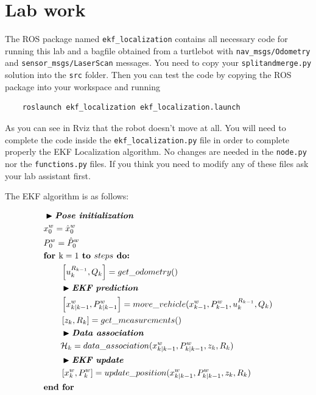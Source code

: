\documentclass[a4paper,10pt]{article}
\begin{document}
\section{Lab work}

The ROS package named \texttt{ekf\_localization} contains all necessary code for running this lab and a bagfile obtained from a turtlebot with \texttt{nav\_msgs/Odometry} and \texttt{sensor\_msgs/LaserScan} messages. You need to copy your \texttt{splitandmerge.py} solution into the \texttt{src} folder. Then you can test the code by copying the ROS package into your workspace and running

\begin{verbatim}
    roslaunch ekf_localization ekf_localization.launch
\end{verbatim}

As you can see in Rviz that the robot doesn't move at all. You will need to complete the code inside the \texttt{ekf\_localization.py} file in order to complete properly the EKF Localization algorithm. No changes are needed in the \texttt{node.py} nor the \texttt{functions.py} files. If you think you need to modify any of these files ask your lab assistant first.


The EKF algorithm is as follows:

\begin{align*} \scriptsize
    & \blacktriangleright \textit{\textbf{Pose initialization}}\\
    & x_0^w = \hat{x}_0^w \\
    & P_0^w = \hat{P}_0^w \\
    & \textbf{for } \text{k} = 1 \textbf{ to } steps \textbf{ do:} \\
    & \qquad \left[ u_k^{R_{k-1}}, Q_k \right] = get\_odometry() \\
    & \qquad \blacktriangleright \textit{\textbf{EKF prediction}}\\
    & \qquad \left[ x_{k|k-1}^w, P_{k|k-1}^w \right] = move\_vehicle(x_{k-1}^w, P_{k-1}^w, u_k^{R_{k-1}}, Q_k) \\
    & \qquad \left[ z_k, R_k \right] = get\_measurements() \\
    & \qquad \blacktriangleright \textit{\textbf{Data association}}\\
    & \qquad \mathcal{H}_k = data\_association(x_{k|k-1}^w, P_{k|k-1}^w, z_k, R_k) \\
    & \qquad \blacktriangleright \textit{\textbf{EKF update}}\\
    & \qquad \left[ x_k^w, P_k^w \right] = update\_position(x_{k|k-1}^w, P_{k|k-1}^w, z_k, R_k) \\
    & \textbf{end for}
\end{align*}
\end{document}
